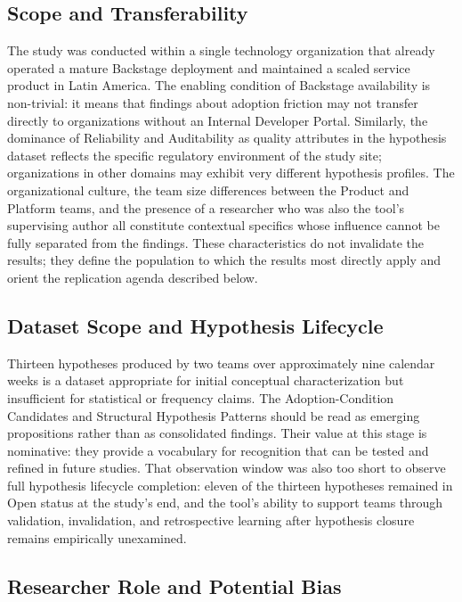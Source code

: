 \subsection{Scope and Transferability}

The study was conducted within a single technology organization that already operated
a mature Backstage deployment and maintained a scaled service product in
Latin America. The enabling condition of Backstage availability is non-trivial: it means
that findings about adoption friction may not transfer directly to organizations without an Internal
Developer Portal. Similarly, the dominance of Reliability and Auditability as quality
attributes in the hypothesis dataset reflects the specific regulatory environment of the
study site; organizations in other domains may exhibit very different hypothesis profiles.
The organizational culture, the team size differences between the Product and Platform
teams, and the presence of a researcher who was also the tool's supervising author
all constitute contextual specifics whose influence cannot be fully separated from the
findings. These characteristics do not invalidate the results; they define the population
to which the results most directly apply and orient the replication agenda described
below.

\subsection{Dataset Scope and Hypothesis Lifecycle}

Thirteen hypotheses produced by two teams over approximately nine calendar weeks is a dataset appropriate for
initial conceptual characterization but insufficient for statistical or frequency claims.
The Adoption-Condition Candidates and Structural Hypothesis Patterns should be read
as emerging propositions rather than as consolidated findings. Their value at
this stage is nominative: they provide a vocabulary for recognition that can be tested and
refined in future studies. That observation window was also too short to observe
full hypothesis lifecycle completion: eleven of the thirteen hypotheses remained in Open
status at the study's end, and the tool's ability to support teams through validation,
invalidation, and retrospective learning after hypothesis closure remains empirically
unexamined.

\subsection{Researcher Role and Potential Bias}

